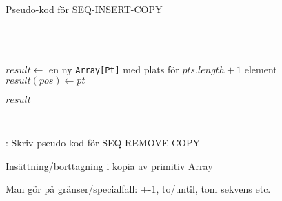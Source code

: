 \begin{Slide}{Pseudo-kod för SEQ-INSERT-COPY}\SlideFontSmall
\begin{algorithm}[H]

  ~\\

 ~\\


 \noindent\hrulefill

  $result \leftarrow$ en ny \texttt{Array[Pt]} med plats för $pts.length + 1$ element \\
 $result(pos) \leftarrow pt$ \\

 \Return $result$

  \noindent\hrulefill\\
\end{algorithm}
\pause\vspace{0.5em}: Skriv pseudo-kod för SEQ-REMOVE-COPY
\end{Slide}

\begin{Slide}{Insättning/borttagning i kopia av primitiv Array}
\vspace{-0.6em}

\pause
\SlideFontSmall Man gör  på gränser/specialfall: +-1, to/until, tom sekvens etc.
\end{Slide}


